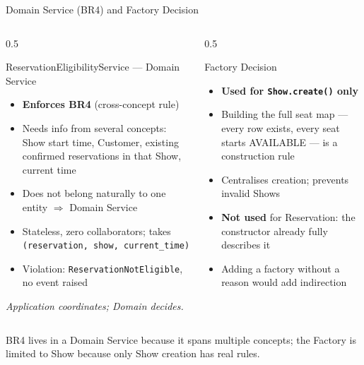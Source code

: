\documentclass[aspectratio=169,11pt]{beamer}
\newcommand{\code}[1]{\texttt{#1}}
\begin{document}
\begin{frame}{Domain Service (BR4) and Factory Decision}
  \begin{columns}[t]
    \begin{column}{0.5\textwidth}
      \begin{block}{ReservationEligibilityService --- Domain Service}
        \scriptsize
        \begin{itemize}
          \item \textbf{Enforces BR4} (cross-concept rule)
          \item Needs info from several concepts: Show start time, Customer,
                existing confirmed reservations in that Show, current time
          \item Does not belong naturally to one entity $\Rightarrow$ Domain
                Service
          \item Stateless, zero collaborators; takes
                \code{(reservation, show, current\_time)}
          \item Violation: \code{ReservationNotEligible}, no event raised
        \end{itemize}
        {\scriptsize\itshape Application coordinates; Domain decides.}
      \end{block}
    \end{column}
    \begin{column}{0.5\textwidth}
      \begin{block}{Factory Decision}
        \scriptsize
        \begin{itemize}
          \item \textbf{Used for \code{Show.create()} only}
          \item Building the full seat map --- every row exists, every seat
                starts AVAILABLE --- is a construction rule
          \item Centralises creation; prevents invalid Shows
          \item \textbf{Not used} for Reservation: the constructor already
                fully describes it
          \item Adding a factory without a reason would add indirection
        \end{itemize}
      \end{block}
    \end{column}
  \end{columns}

  \vspace{0.12cm}
  {\scriptsize BR4 lives in a Domain Service because it spans multiple concepts;
  the Factory is limited to Show because only Show creation has real rules.}
\end{frame}
\end{document}
